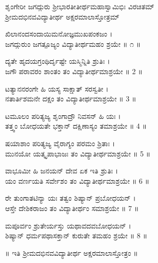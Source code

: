 \begin{center}
ಶೃಂಗೇರೀ ಜಗದ್ಗುರು ಶ್ರೀಭಾರತೀತೀರ್ಥಮಹಾಸ್ವಾಮಿಭಿಃ ವಿರಚಿತಮ್\\[3pt]
ಶ್ರೀಮದಭಿನವವಿದ್ಯಾತೀರ್ಥ ಅಕ್ಷರಮಾಲಾಸ್ತೋತ್ರಮ್
\end{center}
\vskip 0.55cm

\noindent
{}ಖಿಲಾನಂದಸಂದಾಯಿಮನೋಜ್ಞಮುಖಪಂಕಜಂ ।\\
ಜಗದ್ಗುರುಂ ಜಗತ್ಪೂಜ್ಯಂ ವಿದ್ಯಾತೀರ್ಥಮಹಂ ಶ್ರಯೇ ॥ ೧ ॥
\vskip 0.55cm

\noindent
{}ದ್ಯತೇ ಹೃದಯಗ್ರಂಥಿರ್ದೃಷ್ಟೇ ಯಸ್ಮಿನ್ನಿತಿ ಶ್ರುತಿಃ ।\\
ಜಗೌ ಪರಾವರಂ ಶಾಂತಂ ತಂ ವಿದ್ಯಾತೀರ್ಥಮಾಶ್ರಯೇ ॥ 2 ॥
\vskip 0.55cm

\noindent
{}ಟತ್ಯಾನನರಂಗೇ ಹಿ ಯಸ್ಯ ಸಾಕ್ಷಾತ್ ಸರಸ್ವತೀ ।\\
ನತಾರ್ತಿಶಮನೇ ದಕ್ಷಂ ತಂ ವಿದ್ಯಾತೀರ್ಥಮಾಶ್ರಯೇ ॥ 3 ॥
\vskip 0.55cm

\noindent
{}ಟಮೂಲಂ ಪರಿತ್ಯಜ್ಯ ಶೃಂಗಾದ್ರೌ ನಿವಸನ್ ಹಿ ಯಃ ।\\
ತತ್ತ್ವಂ ಬೋಧಯತೇ ಭಕ್ತಾನ್ ದಕ್ಷಿಣಾಸ್ಯಂ ತಮಾಶ್ರಯೇ ॥ 4 ॥
\vskip 0.55cm

\noindent
{}ಷಯಾಶಾಂ ಪರಿತ್ಯಜ್ಯ ವೈರಾಗ್ಯಂ ಪರಮಂ ಶ್ರಿತಾಃ ।\\
ಮುನಯೋ ಯತ್ಕೃಪಾಭಾಜಃ ತಂ ವಿದ್ಯಾತೀರ್ಥಮಾಶ್ರಯೇ ॥ 5 ॥
\vskip 0.55cm

\noindent
{}ವಾಭೂಮೀ ಹಿ ಜನಯನ್ ದೇವ ಏಕ ಇತಿ ಶ್ರುತಿಃ ।\\
ಯಂ ವರ್ಣಯತಿ ಸರ್ವೇಶಂ ತಂ ವಿದ್ಯಾತೀರ್ಥಮಾಶ್ರಯೇ ॥ 6 ॥
\vskip 0.55cm

\noindent
{}ರೇ ತುಂಗಾತಟಿನ್ಯಾ ಯಃ ತತ್ವಂ ಶಿಷ್ಯಾನ್ ಪ್ರಬೋಧಯನ್ ।\\
ಆಸ್ತೇ ದೇಶಿಕರಾಜಂ ತಂ ವಿದ್ಯಾತೀರ್ಥಂ ಸಮಾಶ್ರಯೇ ॥ 7 ॥
\vskip 0.55cm

\noindent
{}ಮಪೂರ್ವಂ ಶ್ರುತೇರ್ಯಸ್ತು ಯಥಾವದವಬೋಧಯನ್ ।\\
ಶಿಷ್ಯಾನ್ ಧರ್ಮಪಥಾಸಕ್ತಾನ್ ಕುರುತೇ ತಮಹಂ ಶ್ರಯೇ ॥ 8 ॥
\vskip 1cm

\centerline{॥ ಇತಿ ಶ್ರೀಮದಭಿನವವಿದ್ಯಾತೀರ್ಥ ಅಕ್ಷರಮಾಲಾಸ್ತೋತ್ರಂ ॥}

